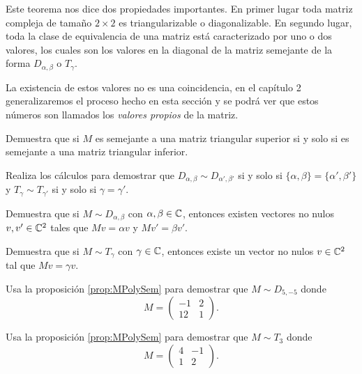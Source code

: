 Este teorema nos dice dos propiedades importantes. En primer lugar toda matriz compleja de tamaño $2 \times 2$ es triangularizable o diagonalizable. En segundo lugar, toda la clase de equivalencia de una matriz está caracterizado por uno o dos valores, los cuales son los valores en la diagonal de la matriz semejante de la forma $D_{\alpha,\beta}$ o $T_\gamma$.

La existencia de estos valores no es una coincidencia, en el capítulo 2 generalizaremos el proceso hecho en esta sección y se podrá ver que estos números son llamados los \emph{valores propios} de la matriz.


\ExerciseSection

\begin{exerciselist}
  \item Demuestra que si $M$ es semejante a una matriz triangular superior si y solo si es semejante a una matriz triangular inferior.
  
  \item Realiza los cálculos para demostrar que $D_{\alpha,\beta} \sim D_{\alpha',\beta'}$ si y solo si $\{\alpha,\beta\} = \{\alpha',\beta'\}$ y $T_\gamma \sim T_{\gamma'}$ si y solo si $\gamma = \gamma'$.

  \item Demuestra que si $M \sim D_{\alpha,\beta}$ con $\alpha,\beta \in \mathbb{C}$, entonces existen vectores no nulos $v, v' \in \mathbb{C}^2$ tales que $Mv = \alpha v$ y $Mv' = \beta v'$.
  
  \item Demuestra que si $M \sim T_\gamma$ con $\gamma \in \mathbb{C}$, entonces existe un vector no nulos $v\in \mathbb{C}^2$ tal que $Mv = \gamma v$.
  
  \item Usa la proposición \ref{prop:MPolySem} para demostrar que $M \sim D_{5, -5}$ donde
    \[ M = \begin{pmatrix}
      -1 & 2 \\
      12 & 1
    \end{pmatrix}. \]
  
  \item Usa la proposición \ref{prop:MPolySem} para demostrar que $M \sim T_{3}$ donde
  \[ M = \begin{pmatrix}
    4 & -1 \\
    1 & 2
  \end{pmatrix}. \]
\end{exerciselist}